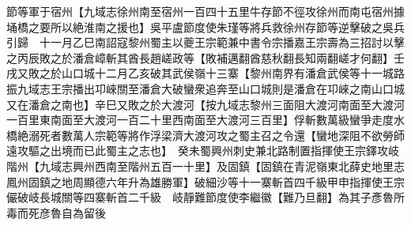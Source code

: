 節等軍于宿州【九域志徐州南至宿州一百四十五里牛存節不徑攻徐州而南屯宿州據埇橋之要所以絶淮南之援也】吳平盧節度使朱瑾等將兵救徐州存節等逆擊破之吳兵引歸　十一月乙巳南詔寇黎州蜀主以夔王宗範兼中書令宗播嘉王宗壽為三招討以擊之丙辰敗之於潘倉嶂斬其酋長趙嵯政等【敗補邁翻酋慈秋翻長知兩翻嵯才何翻】壬戌又敗之於山口城十二月乙亥破其武侯嶺十三寨【黎州南界有潘倉武侯等十一城路振九域志王宗播出卭崍關至潘倉大破蠻衆追奔至山口城則是潘倉在卭崍之南山口城又在潘倉之南也】辛巳又敗之於大渡河【按九域志黎州三面阻大渡河南面至大渡河一百里東南面至大渡河一百二十里西南面至大渡河三百里】俘斬數萬級蠻爭走度水橋絶溺死者數萬人宗範等將作浮梁濟大渡河攻之蜀主召之令還【蠻地深阻不欲勞師遠攻驅之出境而已此蜀主之志也】　癸未蜀興州刺史兼北路制置指揮使王宗鐸攻岐階州【九域志興州西南至階州五百一十里】及固鎮【固鎮在青泥嶺東北薛史地里志鳳州固鎮之地周顯德六年升為雄勝軍】破細沙等十一寨斬首四千級甲申指揮使王宗儼破岐長城關等四寨斬首二千級　岐靜難節度使李繼徽【難乃旦翻】為其子彥魯所毒而死彦魯自為留後

